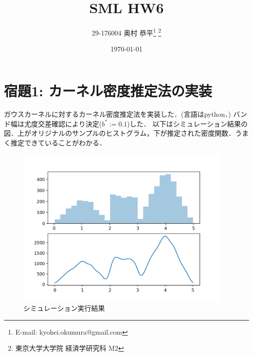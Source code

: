 \documentclass[11pt,a4paper,dvipdfmx]{article}
\theoremstyle{plain}
\newcommand{\1}{\mbox{1}\hspace{-0.25em}\mbox{l}}
\begin{document}
\title{SML HW6}
\author{29-176004 奥村 恭平{\footnote{E-mail: kyohei.okumura@gmail.com}
\footnote{東京大学大学院 経済学研究科 M2}
}}
\date{\today}
\maketitle


\section*{宿題1: カーネル密度推定法の実装}
ガウスカーネルに対するカーネル密度推定法を実装した．(言語はpython．)
バンド幅は尤度交差確認により決定($b^* := 0.1$)した．
以下はシミュレーション結果の図．上がオリジナルのサンプルのヒストグラム，下が推定された密度関数．うまく推定できていることがわかる．

\begin{figure}[H]
  \centering
    \includegraphics[height=8cm]{image/gauss_kernel.png}
    \caption{\footnotesize シミュレーション実行結果}
\end{figure}
\end{document}
